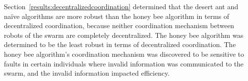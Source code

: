Section~\ref{results:decentralizedcoordination} determined that the desert ant and na\"ive algorithms are more robust than the honey bee algorithm in terms of decentralized coordination, because neither coordination mechanism between robots of the swarm are completely decentralized. The honey bee algorithm was determined to be the least robust in terms of decentralized coordination. The honey bee algorithm's coordination mechanism was discovered to be sensitive to faults in certain individuals where invalid information was communicated to the swarm, and the invalid information impacted efficiency. 


